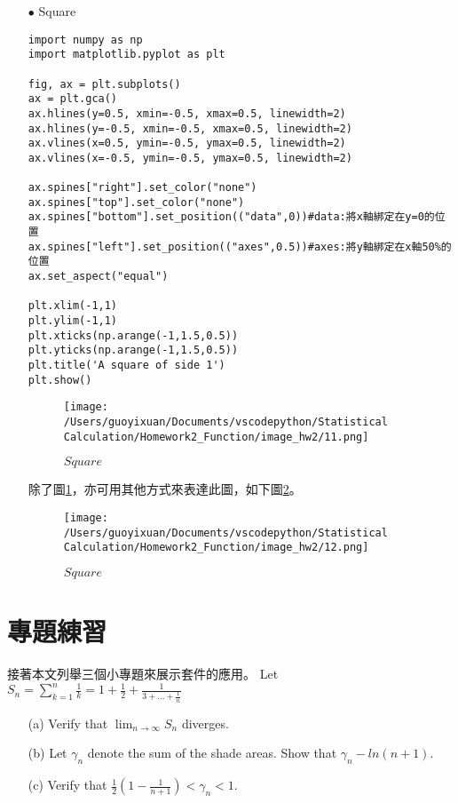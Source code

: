 \begin{itemize}
\item[$\bullet$] Square
\bigskip
\begin{lstlisting}
import numpy as np
import matplotlib.pyplot as plt

fig, ax = plt.subplots()
ax = plt.gca()
ax.hlines(y=0.5, xmin=-0.5, xmax=0.5, linewidth=2)
ax.hlines(y=-0.5, xmin=-0.5, xmax=0.5, linewidth=2)
ax.vlines(x=0.5, ymin=-0.5, ymax=0.5, linewidth=2)
ax.vlines(x=-0.5, ymin=-0.5, ymax=0.5, linewidth=2)

ax.spines["right"].set_color("none")
ax.spines["top"].set_color("none")
ax.spines["bottom"].set_position(("data",0))#data:將x軸綁定在y=0的位置
ax.spines["left"].set_position(("axes",0.5))#axes:將y軸綁定在x軸50%的位置
ax.set_aspect("equal")

plt.xlim(-1,1)
plt.ylim(-1,1)
plt.xticks(np.arange(-1,1.5,0.5))
plt.yticks(np.arange(-1,1.5,0.5))
plt.title('A square of side 1')
plt.show()
\end{lstlisting}

\begin{figure}[H]
    \centering
        \texttt{[image: /Users/guoyixuan/Documents/vscodepython/Statistical Calculation/Homework2\_Function/image\_hw2/11.png]}
    \caption{$Square$}
    \label{fig:square}
\end{figure}

除了圖\ref{fig:square}，亦可用其他方式來表達此圖，如下圖\ref{fig:square1}。
\begin{figure}[H]
    \centering
        \texttt{[image: /Users/guoyixuan/Documents/vscodepython/Statistical Calculation/Homework2\_Function/image\_hw2/12.png]}
    \caption{$Square$}
    \label{fig:square1}
\end{figure}

\end{itemize}


\section{專題練習}
接著本文列舉三個小專題來展示套件的應用。
Let $S_n=\sum_{k=1}^{n}\frac{1}{k}=1+\frac{1}{2}+\frac{1}{3+...+\frac{1}{n}}$
\begin{itemize}
\item[(a)] Verify that $\lim_{n \to \infty}S_n$ diverges.
\item[(b)] Let $\gamma_n$ denote the sum of the shade areas. Show that $\gamma_n-ln(n+1)$.
\item[(c)] Verify that $\frac{1}{2}(1-\frac{1}{n+1}) < \gamma_n < 1.$
\end{itemize}

